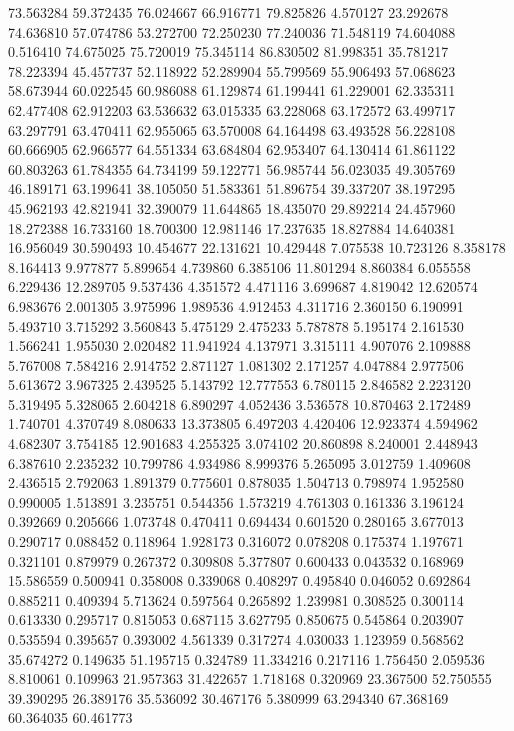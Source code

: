 73.563284
59.372435
76.024667
66.916771
79.825826
4.570127
23.292678
74.636810
57.074786
53.272700
72.250230
77.240036
71.548119
74.604088
0.516410
74.675025
75.720019
75.345114
86.830502
81.998351
35.781217
78.223394
45.457737
52.118922
52.289904
55.799569
55.906493
57.068623
58.673944
60.022545
60.986088
61.129874
61.199441
61.229001
62.335311
62.477408
62.912203
63.536632
63.015335
63.228068
63.172572
63.499717
63.297791
63.470411
62.955065
63.570008
64.164498
63.493528
56.228108
60.666905
62.966577
64.551334
63.684804
62.953407
64.130414
61.861122
60.803263
61.784355
64.734199
59.122771
56.985744
56.023035
49.305769
46.189171
63.199641
38.105050
51.583361
51.896754
39.337207
38.197295
45.962193
42.821941
32.390079
11.644865
18.435070
29.892214
24.457960
18.272388
16.733160
18.700300
12.981146
17.237635
18.827884
14.640381
16.956049
30.590493
10.454677
22.131621
10.429448
7.075538
10.723126
8.358178
8.164413
9.977877
5.899654
4.739860
6.385106
11.801294
8.860384
6.055558
6.229436
12.289705
9.537436
4.351572
4.471116
3.699687
4.819042
12.620574
6.983676
2.001305
3.975996
1.989536
4.912453
4.311716
2.360150
6.190991
5.493710
3.715292
3.560843
5.475129
2.475233
5.787878
5.195174
2.161530
1.566241
1.955030
2.020482
11.941924
4.137971
3.315111
4.907076
2.109888
5.767008
7.584216
2.914752
2.871127
1.081302
2.171257
4.047884
2.977506
5.613672
3.967325
2.439525
5.143792
12.777553
6.780115
2.846582
2.223120
5.319495
5.328065
2.604218
6.890297
4.052436
3.536578
10.870463
2.172489
1.740701
4.370749
8.080633
13.373805
6.497203
4.420406
12.923374
4.594962
4.682307
3.754185
12.901683
4.255325
3.074102
20.860898
8.240001
2.448943
6.387610
2.235232
10.799786
4.934986
8.999376
5.265095
3.012759
1.409608
2.436515
2.792063
1.891379
0.775601
0.878035
1.504713
0.798974
1.952580
0.990005
1.513891
3.235751
0.544356
1.573219
4.761303
0.161336
3.196124
0.392669
0.205666
1.073748
0.470411
0.694434
0.601520
0.280165
3.677013
0.290717
0.088452
0.118964
1.928173
0.316072
0.078208
0.175374
1.197671
0.321101
0.879979
0.267372
0.309808
5.377807
0.600433
0.043532
0.168969
15.586559
0.500941
0.358008
0.339068
0.408297
0.495840
0.046052
0.692864
0.885211
0.409394
5.713624
0.597564
0.265892
1.239981
0.308525
0.300114
0.613330
0.295717
0.815053
0.687115
3.627795
0.850675
0.545864
0.203907
0.535594
0.395657
0.393002
4.561339
0.317274
4.030033
1.123959
0.568562
35.674272
0.149635
51.195715
0.324789
11.334216
0.217116
1.756450
2.059536
8.810061
0.109963
21.957363
31.422657
1.718168
0.320969
23.367500
52.750555
39.390295
26.389176
35.536092
30.467176
5.380999
63.294340
67.368169
60.364035
60.461773
